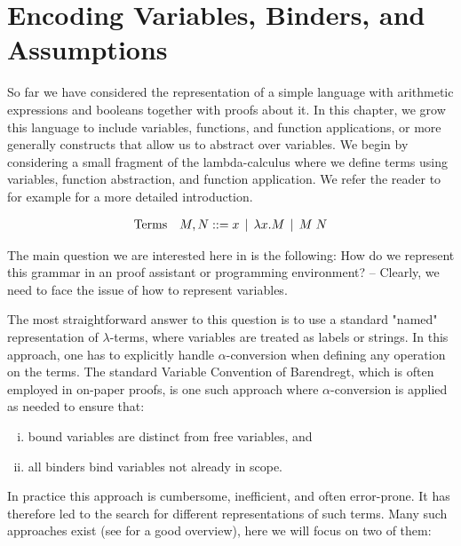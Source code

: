 \chapter{Encoding Variables, Binders, and Assumptions}
\label{chap:binders}
So far we have considered the representation of a simple language with
arithmetic expressions and booleans together with proofs about it. In this
chapter, we grow this language to include variables, functions, and function applications,
or more generally constructs that allow us to abstract over
variables. We begin by considering a small fragment of the
lambda-calculus where we define terms using variables, function
abstraction, and function application. We refer the reader to for
example \citep[Ch 5, Ch 9]{TAPL} for a more detailed introduction.

\[
\begin{array}{ll@{\bnfas}l}
\mbox{Terms} & M, N & x \bnfalt \lam x.M \bnfalt M \app N
\end{array}
\]

The main question we are interested here in is the following: How do we
represent this grammar in an proof assistant or programming environment? -- Clearly, we need to
face the issue of how to represent variables.

The most straightforward answer to this question is to use a standard "named" representation of
$\lambda$-terms, where variables are treated as labels or strings. In
this approach, one has to explicitly handle $\alpha$-conversion when
defining any operation on the terms. The standard Variable Convention
of Barendregt, which is often employed in on-paper proofs, is one such
approach where $\alpha$-conversion is applied as needed to ensure
that:

\begin{enumerate}[(i)]
\item bound variables are distinct from free variables, and
\item all binders bind variables not already in scope.
\end{enumerate}

In practice this approach is cumbersome, inefficient, and often error-prone. It
has therefore led to the search for different representations of such
terms. Many such approaches exist (see \cite{Aydemir:TechReport09} for
a good overview), here we will focus on two of them:

